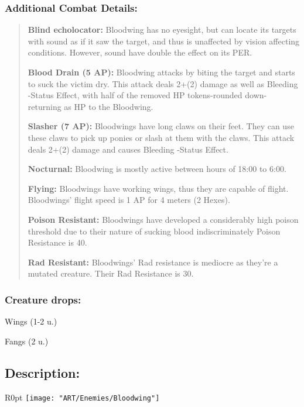 \documentclass[11pt,a4paper,twocolumn]{book}
\begin{document}
	\subsubsection*{Additional Combat Details:}
	\begin{verse}
		\textbf{Blind echolocator:} Bloodwing has no eyesight, but can locate its targets with sound as if it saw the target, and thus is unaffected by vision affecting conditions. However, sound have double the effect on its PER.
		
		\textbf{Blood Drain (5 AP):} Bloodwing attacks by biting the target and starts to suck the victim dry. This attack deals 2+(2) damage as well as Bleeding -Status Effect, with half of the removed HP tokens-rounded down- returning as HP to the Bloodwing.
		
		\textbf{Slasher (7 AP):} Bloodwings have long claws on their feet. They can use these claws to pick up ponies or slash at them with the claws. This attack deals 2+(2) damage and causes Bleeding -Status Effect.
		
		\textbf{Nocturnal:} Bloodwing is mostly active between hours of 18:00 to 6:00.
		
		\textbf{Flying:} Bloodwings have working wings, thus they are capable of flight. Bloodwings' flight speed is 1 AP for 4 meters (2 Hexes).
		
		\textbf{Poison Resistant:} Bloodwings have developed a considerably high poison threshold due to their nature of sucking blood indiscriminately Poison Resistance is 40.
		
		\textbf{Rad Resistant:} Bloodwings' Rad resistance is mediocre as they're a mutated creature. Their Rad Resistance is 30.
	\end{verse}
	
	\subsubsection*{Creature drops:}
	\begin{compactitem}
		\item Wings (1-2 u.)
		\item Fangs (2 u.)
	\end{compactitem}
	
	\subsection*{Description:}
	\begin{wrapfigure}{R}{0pt}
		\texttt{[image: "ART/Enemies/Bloodwing"]}
	\end{wrapfigure}
	
\end{document}
